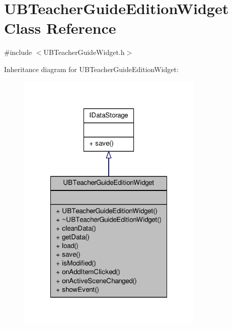 \hypertarget{class_u_b_teacher_guide_edition_widget}{\section{U\-B\-Teacher\-Guide\-Edition\-Widget Class Reference}
\label{de/d83/class_u_b_teacher_guide_edition_widget}
}


{\ttfamily \#include $<$U\-B\-Teacher\-Guide\-Widget.\-h$>$}



Inheritance diagram for U\-B\-Teacher\-Guide\-Edition\-Widget\-:
\nopagebreak
\begin{figure}[H]
\begin{center}
\leavevmode
\includegraphics[width=252pt]{d0/d93/class_u_b_teacher_guide_edition_widget__inherit__graph}
\end{center}
\end{figure}


